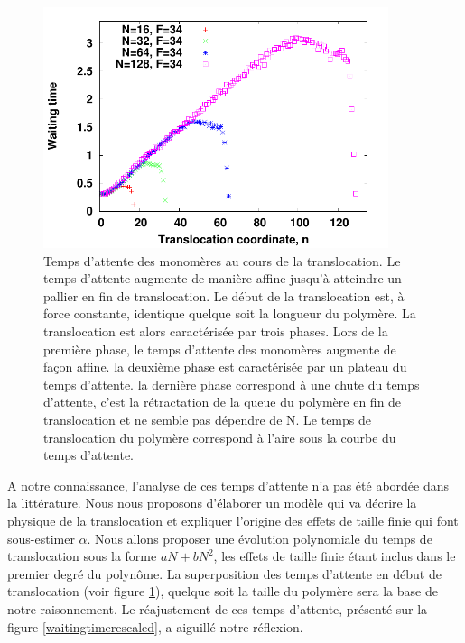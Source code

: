 \begin{figure}[H]
\begin{center}
\includegraphics[width=0.9\textwidth]{waitingtime.pdf}


\caption[Temps d'attente des monomères]{Temps d'attente des monomères au cours de la translocation. Le temps d'attente augmente de manière affine jusqu'à atteindre un pallier en fin de translocation. Le début de la translocation est, à force constante, identique quelque soit la longueur du polymère. La translocation est alors caractérisée par trois phases. Lors de la première phase, le temps d'attente des monomères augmente de façon affine. la deuxième phase est caractérisée par un plateau du temps d'attente. la dernière phase correspond à une chute du temps d'attente, c'est la rétractation de la queue du polymère en fin de translocation et ne semble pas dépendre de N. Le temps de translocation du polymère correspond à l'aire sous la courbe du temps d'attente.}
\label{waitingtime}
\end{center}
\end{figure}


A notre connaissance, l'analyse de ces temps d'attente n'a pas été abordée dans la littérature. Nous nous proposons d'élaborer un modèle qui va décrire la physique de la translocation et expliquer l'origine des effets de taille finie qui font sous-estimer $\alpha$. Nous allons proposer une évolution polynomiale du temps de translocation sous la forme $aN +b N^2$, les effets de taille finie étant inclus dans le premier degré du polynôme. La superposition des temps d'attente en début de translocation (voir figure \ref{waitingtime}), quelque soit la taille du polymère sera la base de notre raisonnement. Le réajustement de ces temps d'attente, présenté sur la figure \ref{waitingtimerescaled}, a aiguillé notre réflexion.


